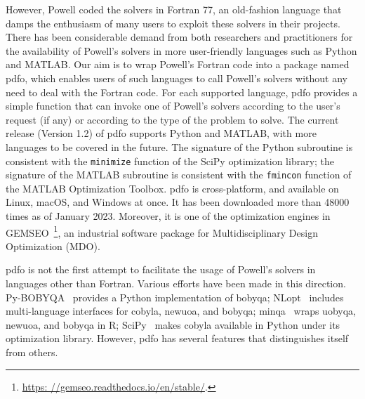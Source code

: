 \documentclass[
    smallextended,  %
    draft,          %
]{svjour3}
\begin{document}
However, Powell coded the solvers in Fortran 77, an old-fashion language that damps the enthusiasm of many users to exploit these solvers in their projects.
There has been considerable demand from both researchers and practitioners for the availability of Powell's solvers in more user-friendly languages such as Python and MATLAB.
Our aim is to wrap Powell's Fortran code into a package named \gls{pdfo}, which enables users of such languages to call Powell's solvers without any need to deal with the Fortran code.
For each supported language, \gls{pdfo} provides a simple function that can invoke one of Powell's solvers according to the user's request (if any) or according to the type of the problem to solve.
The current release (Version 1.2) of \gls{pdfo} supports Python and MATLAB, with more languages to be covered in the future.
The signature of the Python subroutine is consistent with the \texttt{minimize} function of the SciPy optimization library; the signature of the MATLAB subroutine is consistent with the \texttt{fmincon} function of the MATLAB Optimization Toolbox.
\gls{pdfo} is cross-platform, and available on Linux, macOS, and Windows at once.
It has been downloaded more than \num{48000} times as of January 2023.
Moreover, it is one of the optimization engines in GEMSEO~\cite{Gallard_Etal_2018}\footnote{\url{https: //gemseo.readthedocs.io/en/stable/}.}, an industrial software package for Multidisciplinary Design Optimization (MDO).

\Gls{pdfo} is not the first attempt to facilitate the usage of Powell's solvers in languages other than Fortran.
Various efforts have been made in this direction.
Py-BOBYQA~\cite{Cartis_Etal_2019,Cartis_Roberts_Sheridan-Methven_2022} provides a Python implementation of \gls{bobyqa}; NLopt~\cite{Johnson_2019} includes multi-language interfaces for \gls{cobyla}, \gls{newuoa}, and \gls{bobyqa}; minqa~\cite{Bates_Etal_2014} wraps \gls{uobyqa}, \gls{newuoa}, and \gls{bobyqa} in R; SciPy~\cite{Virtanen_Etal_2020} makes \gls{cobyla} available in Python under its optimization library.
However, \gls{pdfo} has several features that distinguishes itself from others.
\end{document}
